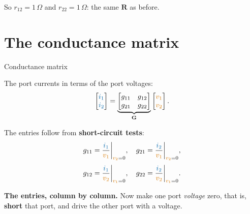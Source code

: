 \documentclass[11pt,a4paper]{article}
\newcommand{\Icol}[1]{\textcolor{ccur}{#1}}
\newcommand{\Vcol}[1]{\textcolor{cvolt}{#1}}
\newcommand{\ohm}{\,\Omega}
\newcommand{\yes}{\textcolor{cpow}{\checkmark}}
\newcommand{\vone}{\Vcol{v_1}}  \newcommand{\vtwo}{\Vcol{v_2}}
\newcommand{\ione}{\Icol{i_1}}  \newcommand{\itwo}{\Icol{i_2}}
\newcommand{\Rm}{\mathbf{R}}  \newcommand{\Gm}{\mathbf{G}}
\begin{document}
\smallskip
So $r_{12} = 1\ohm$ and $r_{22} = 1\ohm$: the same $\Rm$ as before. \ \yes

\section{The conductance matrix}

\begin{definitionbox}{Conductance matrix}
\begin{minipage}[c]{0.46\linewidth}
The port currents in terms of the port voltages:
\[
  \begin{bmatrix} \ione\\ \itwo \end{bmatrix}
  = \underbrace{\begin{bmatrix} g_{11} & g_{12}\\ g_{21} & g_{22} \end{bmatrix}}_{\Gm}
    \begin{bmatrix} \vone\\ \vtwo \end{bmatrix} .
\]
\end{minipage}\hfill
\begin{minipage}[c]{0.5\linewidth}
The entries follow from \textbf{short-circuit tests}:
\[
  g_{11} = \frac{\ione}{\vone}\bigg|_{\vtwo = 0}, \quad
  g_{21} = \frac{\itwo}{\vone}\bigg|_{\vtwo = 0},
\]
\[
  g_{12} = \frac{\ione}{\vtwo}\bigg|_{\vone = 0}, \quad
  g_{22} = \frac{\itwo}{\vtwo}\bigg|_{\vone = 0} .
\]
\end{minipage}
\end{definitionbox}

\textbf{The entries, column by column.} Now make one port \emph{voltage} zero, that is,
\textbf{short} that port, and drive the other port with a voltage.
\end{document}
